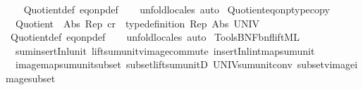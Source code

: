 \begin{isabellebody}
%
\isadelimproof
\ \ %
\endisadelimproof
%
\isatagproof
{}\isamarkupfalse%
\ Quotient{\isacharunderscore}{\kern0pt}def\ eq{\isacharunderscore}{\kern0pt}onp{\isacharunderscore}{\kern0pt}def\isanewline
\ \ \isamarkupfalse%
\ unfold{\isacharunderscore}{\kern0pt}locales\ auto%
\endisatagproof
{\isafoldproof}%
%
\isadelimproof
\isanewline
%
\endisadelimproof
\isanewline
{}\isamarkupfalse%
\ Quotient{\isacharunderscore}{\kern0pt}eq{\isacharunderscore}{\kern0pt}onp{\isacharunderscore}{\kern0pt}type{\isacharunderscore}{\kern0pt}copy{\isacharcolon}{\kern0pt}\isanewline
\ \ {\isachardoublequoteopen}Quotient\ {\isacharparenleft}{\kern0pt}{\isacharequal}{\kern0pt}{\isacharparenright}{\kern0pt}\ Abs\ Rep\ cr\ {\isasymLongrightarrow}\ type{\isacharunderscore}{\kern0pt}definition\ Rep\ Abs\ UNIV{\isachardoublequoteclose}\isanewline
%
\isadelimproof
\ \ %
\endisadelimproof
%
\isatagproof
{}\isamarkupfalse%
\ Quotient{\isacharunderscore}{\kern0pt}def\ eq{\isacharunderscore}{\kern0pt}onp{\isacharunderscore}{\kern0pt}def\isanewline
\ \ \isamarkupfalse%
\ unfold{\isacharunderscore}{\kern0pt}locales\ auto%
\endisatagproof
{\isafoldproof}%
%
\isadelimproof
\isanewline
%
\endisadelimproof
%
\isadelimML
\isanewline
%
\endisadelimML
%
\isatagML
{}\isamarkupfalse%
\ {\isachardoublequoteopen}Tools{\isacharslash}{\kern0pt}BNF{\isacharslash}{\kern0pt}bnf{\isacharunderscore}{\kern0pt}lift{\isachardot}{\kern0pt}ML{\isachardoublequoteclose}%
\endisatagML
{\isafoldML}%
%
\isadelimML
\isanewline
%
\endisadelimML
\isanewline
{}\isamarkupfalse%
\isanewline
\ \ sum{\isacharunderscore}{\kern0pt}insert{\isacharunderscore}{\kern0pt}Inl{\isacharunderscore}{\kern0pt}unit\ lift{\isacharunderscore}{\kern0pt}sum{\isacharunderscore}{\kern0pt}unit{\isacharunderscore}{\kern0pt}vimage{\isacharunderscore}{\kern0pt}commute\ insert{\isacharunderscore}{\kern0pt}Inl{\isacharunderscore}{\kern0pt}int{\isacharunderscore}{\kern0pt}map{\isacharunderscore}{\kern0pt}sum{\isacharunderscore}{\kern0pt}unit\isanewline
\ \ image{\isacharunderscore}{\kern0pt}map{\isacharunderscore}{\kern0pt}sum{\isacharunderscore}{\kern0pt}unit{\isacharunderscore}{\kern0pt}subset\ subset{\isacharunderscore}{\kern0pt}lift{\isacharunderscore}{\kern0pt}sum{\isacharunderscore}{\kern0pt}unitD\ UNIV{\isacharunderscore}{\kern0pt}sum{\isacharunderscore}{\kern0pt}unit{\isacharunderscore}{\kern0pt}conv\ subset{\isacharunderscore}{\kern0pt}vimage{\isacharunderscore}{\kern0pt}image{\isacharunderscore}{\kern0pt}subset\isanewline

\end{isabellebody}
